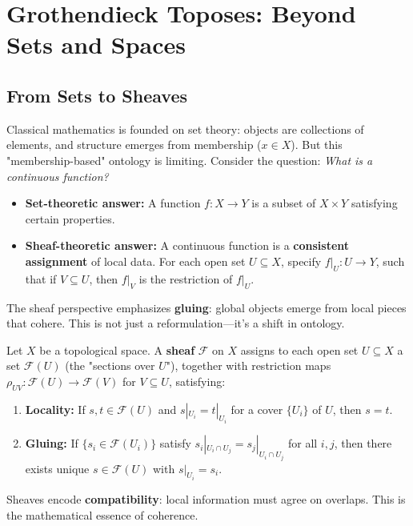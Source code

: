 \section{Grothendieck Toposes: Beyond Sets and Spaces}

\subsection{From Sets to Sheaves}

Classical mathematics is founded on set theory: objects are collections of elements, and structure emerges from membership ($x \in X$). But this "membership-based" ontology is limiting. Consider the question: \textit{What is a continuous function?}

\begin{itemize}
\item \textbf{Set-theoretic answer:} A function $f: X \to Y$ is a subset of $X \times Y$ satisfying certain properties.
\item \textbf{Sheaf-theoretic answer:} A continuous function is a \textbf{consistent assignment} of local data. For each open set $U \subseteq X$, specify $f|_U: U \to Y$, such that if $V \subseteq U$, then $f|_V$ is the restriction of $f|_U$.
\end{itemize}

The sheaf perspective emphasizes \textbf{gluing}: global objects emerge from local pieces that cohere. This is not just a reformulation—it's a shift in ontology.

\begin{definition}
\label{def:sheaf}
Let $X$ be a topological space. A \textbf{sheaf} $\mathcal{F}$ on $X$ assigns to each open set $U \subseteq X$ a set $\mathcal{F}(U)$ (the "sections over $U$"), together with restriction maps $\rho_{UV}: \mathcal{F}(U) \to \mathcal{F}(V)$ for $V \subseteq U$, satisfying:
\begin{enumerate}
\item \textbf{Locality:} If $s, t \in \mathcal{F}(U)$ and $s|_{U_i} = t|_{U_i}$ for a cover $\{U_i\}$ of $U$, then $s = t$.
\item \textbf{Gluing:} If $\{s_i \in \mathcal{F}(U_i)\}$ satisfy $s_i|_{U_i \cap U_j} = s_j|_{U_i \cap U_j}$ for all $i, j$, then there exists unique $s \in \mathcal{F}(U)$ with $s|_{U_i} = s_i$.
\end{enumerate}
\end{definition}

Sheaves encode \textbf{compatibility}: local information must agree on overlaps. This is the mathematical essence of coherence.

